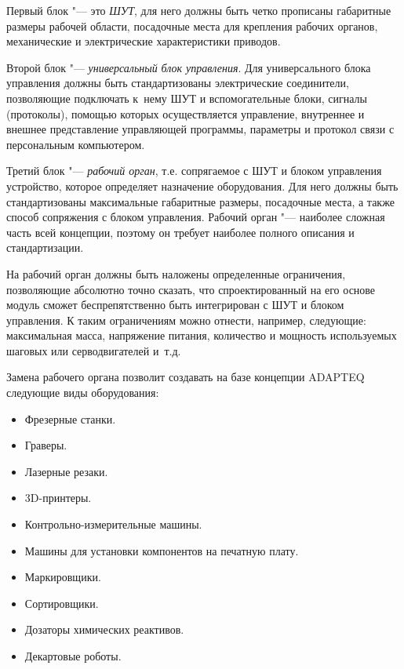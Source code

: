 Первый блок "--- это \textit{ШУТ}, для него должны быть четко прописаны габаритные размеры рабочей области, посадочные места для крепления рабочих органов, механические и электрические характеристики приводов.

Второй блок "--- \textit{универсальный} \textit{блок управления}. Для универсального блока управления должны быть стандартизованы электрические соединители, позволяющие подключать к~нему ШУТ и вспомогательные блоки, сигналы (протоколы), помощью которых осуществляется управление, внутреннее и внешнее представление управляющей программы, параметры и протокол связи с персональным компьютером.

Третий блок "--- \textit{рабочий орган}, т.е. сопрягаемое с ШУТ и блоком управления устройство, которое определяет назначение оборудования. Для него должны быть стандартизованы максимальные габаритные размеры, посадочные места, а также способ сопряжения с блоком управления. Рабочий орган "--- наиболее сложная часть всей концепции, поэтому он требует наиболее полного описания и стандартизации.

На рабочий орган должны быть наложены определенные ограничения, позволяющие абсолютно точно сказать, что спроектированный на его основе модуль сможет беспрепятственно быть интегрирован с ШУТ и блоком управления. К таким ограничениям можно отнести, например, следующие: максимальная масса, напряжение питания, количество и мощность используемых шаговых или серводвигателей и~т.\:д.

Замена рабочего органа позволит создавать на базе концепции \foreignlanguage{english}{ADAPTEQ} следующие виды оборудования:

\begin{itemize}
	\item Фрезерные станки.
	
	\item Граверы.
	
	\item Лазерные резаки.
	
	\item 3\foreignlanguage{english}{D-}принтеры.
	
	\item Контрольно-измерительные машины.
	
	\item Машины для установки компонентов на печатную плату.
	
	\item Маркировщики.
	
	\item Сортировщики.
	
	\item Дозаторы химических реактивов.
	
	\item Декартовые роботы.
\end{itemize}

